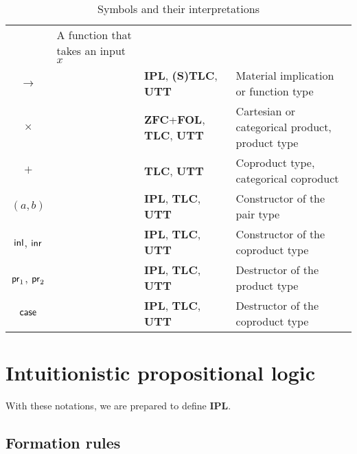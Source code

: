 \documentclass[12pt,twoside]{reedthesis}
\makeatletter
\let\oldindex\index
\renewcommand{\index}[1]
               {\oldindex{#1}\marginpar{\footnotesize\color{index}index: #1}}
\newcommand{\indeX}{\oldindex}
\newcommand{\indeX}{\index}
\newcommand{\abbreviation}[1]{\textbf{#1}\indeX{#1@\textbf{#1}}} %
\makeatother
\begin{document}
\begin{sidewaystable}
\begin{tabular}{c | l | l | l}
      & A function that takes an input $x$ \\
    $→$       
      & 
      & \abbreviation{IPL}, \abbreviation{(S)TLC}, \abbreviation{UTT} 
      & Material implication or function type \\
    $×$       
      & 
      & \abbreviation{ZFC}+\abbreviation{FOL}, \abbreviation{TLC}, \abbreviation{UTT} 
      & Cartesian or categorical product, product type \\
    $+$       
      & 
      & \abbreviation{TLC}, \abbreviation{UTT} 
      & Coproduct type, categorical coproduct \\
    $(a,b)$       
      & 
      & \abbreviation{IPL}, \abbreviation{TLC}, \abbreviation{UTT} 
      & Constructor of the pair type \\
    $\mathsf{inl}$, $\mathsf{inr}$       
      & 
      & \abbreviation{IPL}, \abbreviation{TLC}, \abbreviation{UTT} 
      & Constructor of the coproduct type \\
    $\mathsf{pr}_{1}$, $\mathsf{pr}_{2}$
      & 
      & \abbreviation{IPL}, \abbreviation{TLC}, \abbreviation{UTT} 
      & Destructor of the product type \\
    $\mathsf{case}$       
      & 
      & \abbreviation{IPL}, \abbreviation{TLC}, \abbreviation{UTT} 
      & Destructor of the coproduct type \\
  \end{tabular}
  \caption{\label{tab:symbols}Symbols and their interpretations}
\end{sidewaystable}

\section{Intuitionistic propositional logic}
\label{sec:ipl}

With these notations, we are prepared to define \abbreviation{IPL}.

\subsection{Formation rules}
\label{subsec:ipl-form}
\end{document}

